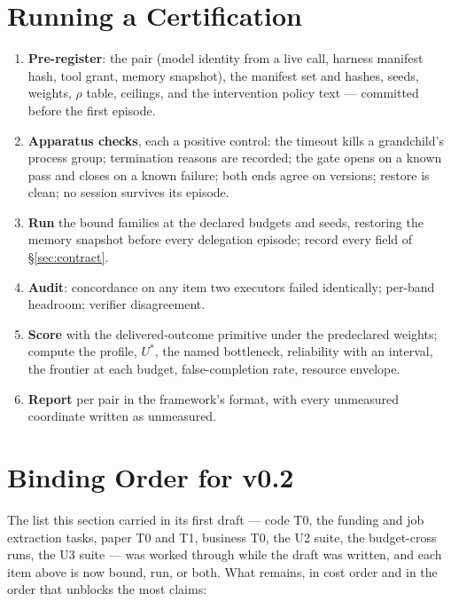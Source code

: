 \section{Running a Certification}\label{sec:run}

\begin{enumerate}[leftmargin=*]
\item \textbf{Pre-register}: the pair (model identity from a live call, harness manifest hash, tool grant, memory snapshot), the manifest set and hashes, seeds, weights, $\rho$ table, ceilings, and the intervention policy text --- committed before the first episode.
\item \textbf{Apparatus checks}, each a positive control: the timeout kills a grandchild's process group; termination reasons are recorded; the gate opens on a known pass and closes on a known failure; both ends agree on versions; restore is clean; no session survives its episode.
\item \textbf{Run} the bound families at the declared budgets and seeds, restoring the memory snapshot before every delegation episode; record every field of \S\ref{sec:contract}.
\item \textbf{Audit}: concordance on any item two executors failed identically; per-band headroom; verifier disagreement.
\item \textbf{Score} with the delivered-outcome primitive under the predeclared weights; compute the profile, $U^{*}$, the named bottleneck, reliability with an interval, the frontier at each budget, false-completion rate, resource envelope.
\item \textbf{Report} per pair in the framework's format, with every unmeasured coordinate written as unmeasured.
\end{enumerate}

\section{Binding Order for v0.2}\label{sec:roadmap}

The list this section carried in its first draft --- code T0, the funding and job extraction tasks, paper T0 and T1, business T0, the U2 suite, the budget-cross runs, the U3 suite --- was worked through while the draft was written, and each item above is now bound, run, or both. What remains, in cost order and in the order that unblocks the most claims:

